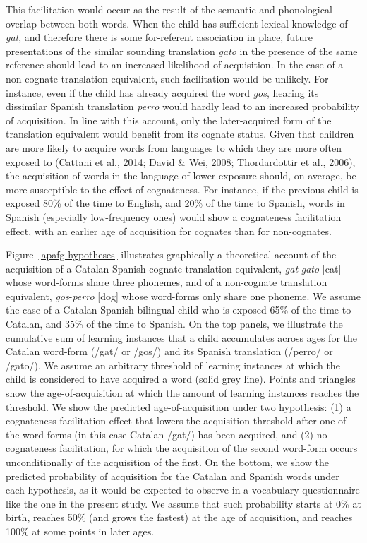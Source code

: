 \documentclass[
  man,
  floatsintext,
  colorlinks=true,linkcolor=blue,citecolor=blue,urlcolor=blue,biblatex]{apa7}
\begin{document}
This facilitation would occur as the result of the semantic and
phonological overlap between both words. When the child has sufficient
lexical knowledge of \emph{gat}, and therefore there is some
for-referent association in place, future presentations of the similar
sounding translation \emph{gato} in the presence of the same reference
should lead to an increased likelihood of acquisition. In the case of a
non-cognate translation equivalent, such facilitation would be unlikely.
For instance, even if the child has already acquired the word
\emph{gos}, hearing its dissimilar Spanish translation \emph{perro}
would hardly lead to an increased probability of acquisition. In line
with this account, only the later-acquired form of the translation
equivalent would benefit from its cognate status. Given that children
are more likely to acquire words from languages to which they are more
often exposed to (Cattani et al., 2014; David \& Wei, 2008;
Thordardottir et al., 2006), the acquisition of words in the language of
lower exposure should, on average, be more susceptible to the effect of
cognateness. For instance, if the previous child is exposed 80\% of the
time to English, and 20\% of the time to Spanish, words in Spanish
(especially low-frequency ones) would show a cognateness facilitation
effect, with an earlier age of acquisition for cognates than for
non-cognates.

Figure~\ref{apafg-hypotheses} illustrates graphically a theoretical
account of the acquisition of a Catalan-Spanish cognate translation
equivalent, \emph{gat}-\emph{gato} {[}cat{]} whose word-forms share
three phonemes, and of a non-cognate translation equivalent,
\emph{gos}-\emph{perro} {[}dog{]} whose word-forms only share one
phoneme. We assume the case of a Catalan-Spanish bilingual child who is
exposed 65\% of the time to Catalan, and 35\% of the time to Spanish. On
the top panels, we illustrate the cumulative sum of learning instances
that a child accumulates across ages for the Catalan word-form (/gat/ or
/gos/) and its Spanish translation (/perro/ or /gato/). We assume an
arbitrary threshold of learning instances at which the child is
considered to have acquired a word (solid grey line). Points and
triangles show the age-of-acquisition at which the amount of learning
instances reaches the threshold. We show the predicted
age-of-acquisition under two hypothesis: (1) a cognateness facilitation
effect that lowers the acquisition threshold after one of the word-forms
(in this case Catalan /gat/) has been acquired, and (2) no cognateness
facilitation, for which the acquisition of the second word-form occurs
unconditionally of the acquisition of the first. On the bottom, we show
the predicted probability of acquisition for the Catalan and Spanish
words under each hypothesis, as it would be expected to observe in a
vocabulary questionnaire like the one in the present study. We assume
that such probability starts at 0\% at birth, reaches 50\% (and grows
the fastest) at the age of acquisition, and reaches 100\% at some points
in later ages.
\end{document}
